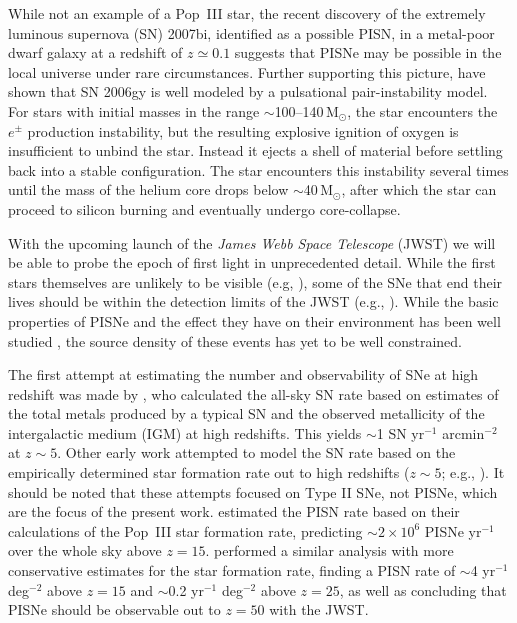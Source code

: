 \documentclass{thesis}
\newcommand{\msun}{\ensuremath{\,\mathrm{M}_{\odot}}\xspace}
\begin{document}
While not an example of a Pop~III star, the recent discovery of the
extremely luminous supernova (SN) 2007bi, identified as a possible
PISN, in a metal-poor dwarf galaxy at a redshift of $z\simeq0.1$
\citep{Gal-Yametal2009} suggests that PISNe may be possible in the
local universe under rare circumstances. Further supporting this
picture, \citet{WoosleyBlinnikovHeger2007} have shown that SN 2006gy
\citep{Smithetal2007} is well modeled by a pulsational
pair-instability model. For stars with initial masses in the range
$\sim$100--140\msun, the star encounters the $e^{\pm}$ production
instability, but the resulting explosive ignition of oxygen is
insufficient to unbind the star.  Instead it ejects a shell of
material before settling back into a stable configuration.  The star
encounters this instability several times until the mass of the helium
core drops below $\sim$40\msun, after which the star can proceed to
silicon burning and eventually undergo core-collapse.

With the upcoming launch of the {\it James Webb Space Telescope}
(JWST) we will be able to probe the epoch of first light in
unprecedented detail.  While the first stars themselves are unlikely
to be visible (e.g, \citealt{BrommKudritzkiLoeb2001,
  PawlikMilosavljevicBromm2011}), some of the SNe that end their lives
should be within the detection limits of the JWST (e.g.,
\citealt{MackeyBrommHernquist2003, Scannapiecoetal2005,
  Gardneretal2006}). While the basic properties of PISNe and the
effect they have on their environment has been well studied
\citep{MoriFerraraMadau2002, BrommYoshidaHernquist2003,
  FurlanettoLoeb2003, KitayamaYoshida2005, Whalenetal2008,
  WiseAbel2008, Greifetal2010}, the source density of these events has
yet to be well constrained.

The first attempt at estimating the number and observability of SNe at
high redshift was made by \citet{Miralda-EscudeRees1997}, who
calculated the all-sky SN rate based on estimates of the total metals
produced by a typical SN and the observed metallicity of the
intergalactic medium (IGM) at high redshifts.  This yields $\sim$1 SN
yr$^{-1}$ arcmin$^{-2}$ at $z \sim 5$. Other early work attempted to
model the SN rate based on the empirically determined star formation
rate out to high redshifts ($z \sim 5$; e.g.,
\citealt{MadauDellaVallePanagia1998, DahlenFransson1999}).  It should
be noted that these attempts focused on Type II SNe, not PISNe, which
are the focus of the present work. \citet{MackeyBrommHernquist2003}
estimated the PISN rate based on their calculations of the Pop~III
star formation rate, predicting $\sim$$2\times10^6$ PISNe yr$^{-1}$
over the whole sky above $z=15$.  \citet{WeinmannLilly2005} performed
a similar analysis with more conservative estimates for the star
formation rate, finding a PISN rate of $\sim$4 yr$^{-1}$ deg$^{-2}$
above $z=15$ and $\sim$0.2 yr$^{-1}$ deg$^{-2}$ above $z=25$, as well
as concluding that PISNe should be observable out to $z=50$ with the
JWST.
\end{document}
